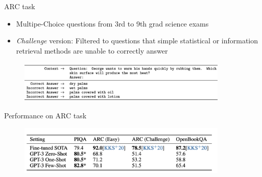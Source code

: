 
\begin{vbframe}{ARC task}

\vfill

\begin{itemize}
	\item Multipe-Choice questions from 3rd to 9th grad science exams
	\item \textit{Challenge} version: Filtered to questions that simple statistical or information retrieval methods are unable to correctly answer
\end{itemize}

	\begin{figure}
		\centering
		\includegraphics[width=10cm]{figure/arcformat.png}\\
	\end{figure}

\vfill

\end{vbframe}



\begin{vbframe}{Performance on ARC task}

\vfill

	\begin{figure}
		\centering
		\includegraphics[width=10cm]{figure/arcperf.png}
	\end{figure}

\vfill

\end{vbframe}



